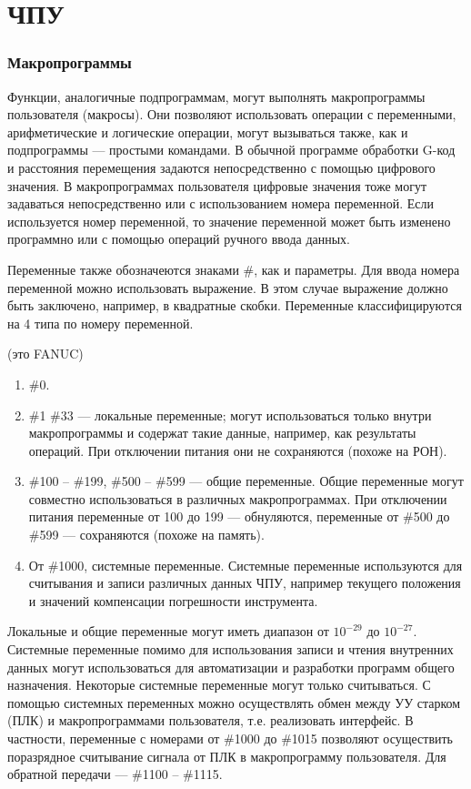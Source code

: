 \part{ЧПУ}

\section{Макропрограммы}

Функции, аналогичные подпрограммам, могут выполнять макропрограммы пользователя (макросы). Они позволяют использовать операции с переменными, арифметические и логические операции, могут вызываться также, как и подпрограммы --- простыми командами. В обычной программе обработки G-код и расстояния перемещения задаются непосредственно с помощью цифрового значения. В макропрограммах пользователя цифровые значения тоже могут задаваться непосредственно или с использованием номера переменной. Если используется номер переменной, то значение переменной может быть изменено программно или с помощью операций ручного ввода данных.

Переменные также обозначеются знаками \#, как и параметры. Для ввода номера переменной можно использовать выражение. В этом случае выражение должно быть заключено, например, в квадратные скобки. Переменные классифицируются на 4 типа по номеру переменной.

(это FANUC)

\begin{enumerate}
    \item \#0.
    \item \#1 \#33 --- локальные переменные; могут использоваться только внутри макропрограммы и содержат такие данные, например, как результаты операций. При отключении питания они не сохраняются (похоже на РОН).
    \item \#100 -- \#199, \#500 -- \#599 --- общие переменные. Общие переменные могут совместно использоваться в различных макропрограммах. При отключении питания переменные от 100 до 199 --- обнуляются, переменные от \#500 до \#599 --- сохраняются (похоже на память).
    \item От \#1000, системные переменные. Системные переменные используются для считывания и записи различных данных ЧПУ, например текущего положения и значений компенсации погрешности инструмента.
\end{enumerate}
    
Локальные и общие переменные могут иметь диапазон от $10^{-29}$ до $10^{-27}$. Системные переменные помимо для использования записи и чтения внутренних данных могут использоваться для автоматизации и разработки программ общего назначения. Некоторые системные переменные могут только считываться. С помощью системных переменных можно осуществлять обмен между УУ старком (ПЛК) и макропрограммами пользователя, т.е. реализовать интерфейс. В частности, переменные с номерами от \#1000 до \#1015 позволяют осуществить поразрядное считывание сигнала от ПЛК в макропрограмму пользователя. Для обратной передачи --- \#1100 -- \#1115.

